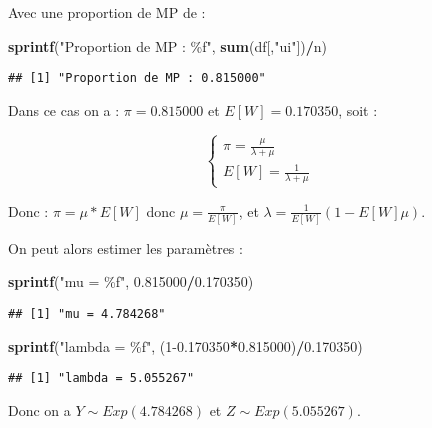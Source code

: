 \documentclass[
]{article}
\newenvironment{Shaded}{\begin{snugshade}}{\end{snugshade}}
\newcommand{\DecValTok}[1]{\textcolor[rgb]{0.00,0.00,0.81}{#1}}
\newcommand{\FloatTok}[1]{\textcolor[rgb]{0.00,0.00,0.81}{#1}}
\newcommand{\FunctionTok}[1]{\textcolor[rgb]{0.13,0.29,0.53}{\textbf{#1}}}
\newcommand{\NormalTok}[1]{#1}
\newcommand{\SpecialCharTok}[1]{\textcolor[rgb]{0.81,0.36,0.00}{\textbf{#1}}}
\newcommand{\StringTok}[1]{\textcolor[rgb]{0.31,0.60,0.02}{#1}}
\begin{document}
Avec une proportion de MP de :

\begin{Shaded}
\begin{Highlighting}[]
\FunctionTok{sprintf}\NormalTok{(}\StringTok{"Proportion de MP : \%f"}\NormalTok{, }\FunctionTok{sum}\NormalTok{(df[,}\StringTok{"ui"}\NormalTok{])}\SpecialCharTok{/}\NormalTok{n)}
\end{Highlighting}
\end{Shaded}

\begin{verbatim}
## [1] "Proportion de MP : 0.815000"
\end{verbatim}

Dans ce cas on a : \(\pi = 0.815000\) et \(E[W] = 0.170350\), soit :

\[
\left\{
  \begin{array}{ll}
    \pi = \frac{\mu}{\lambda + \mu} \\
    E[W] = \frac{1}{\lambda + \mu}
  \end{array}
\right.
\]

Donc : \(\pi = \mu * E[W]\) donc \(\mu = \frac{\pi}{E[W]}\), et
\(\lambda = \frac{1}{E[W]}(1-E[W]\mu)\).

On peut alors estimer les paramètres :

\begin{Shaded}
\begin{Highlighting}[]
\FunctionTok{sprintf}\NormalTok{(}\StringTok{"mu = \%f"}\NormalTok{, }\FloatTok{0.815000}\SpecialCharTok{/}\FloatTok{0.170350}\NormalTok{)}
\end{Highlighting}
\end{Shaded}

\begin{verbatim}
## [1] "mu = 4.784268"
\end{verbatim}

\begin{Shaded}
\begin{Highlighting}[]
\FunctionTok{sprintf}\NormalTok{(}\StringTok{"lambda = \%f"}\NormalTok{, (}\DecValTok{1}\FloatTok{{-}0.170350}\SpecialCharTok{*}\FloatTok{0.815000}\NormalTok{)}\SpecialCharTok{/}\FloatTok{0.170350}\NormalTok{)}
\end{Highlighting}
\end{Shaded}

\begin{verbatim}
## [1] "lambda = 5.055267"
\end{verbatim}

Donc on a \(Y \sim Exp(4.784268)\) et \(Z \sim Exp(5.055267)\).
\end{document}
